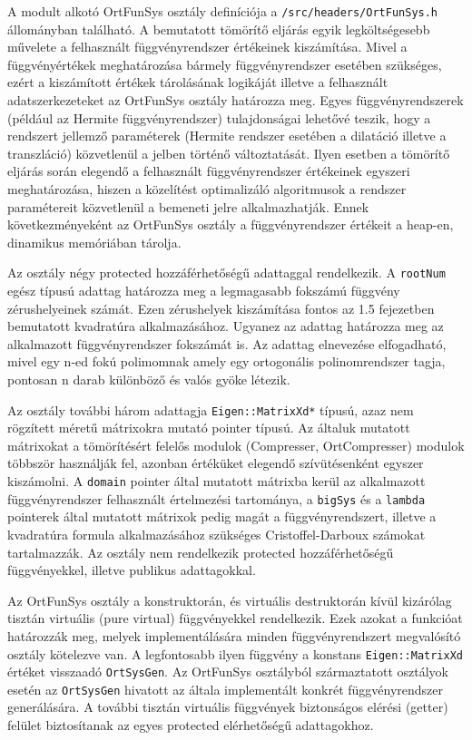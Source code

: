 \documentclass[oneside,titlepage,12pt,a4paper]{report}
\begin{document}
\par  A modult alkotó OrtFunSys osztály definíciója a \texttt{/src/headers/OrtFunSys.h} állományban található. A bemutatott tömörítő eljárás egyik legköltségesebb művelete
a felhasznált függvényrendszer értékeinek kiszámítása. Mivel a függvényértékek meghatározása bármely függvényrendszer esetében szükséges, ezért a kiszámított értékek
tárolásának logikáját illetve a felhasznált adatszerkezeteket az OrtFunSys osztály határozza meg. Egyes függvényrendszerek (például az Hermite függvényrendszer) tulajdonságai
lehetővé teszik, hogy a rendszert jellemző paraméterek (Hermite rendszer esetében a dilatáció illetve a transzláció) közvetlenül a jelben történő változtatását. 
Ilyen esetben a tömörítő eljárás során elegendő a felhasznált függvényrendszer értékeinek egyszeri meghatározása, hiszen a közelítést optimalizáló algoritmusok 
a rendszer paramétereit közvetlenül a bemeneti jelre alkalmazhatják. Ennek következményeként az OrtFunSys osztály a függvényrendszer értékeit a heap-en, dinamikus memóriában tárolja.
\par Az osztály négy protected hozzáférhetőségű adattaggal rendelkezik. A \texttt{rootNum} egész típusú adattag határozza meg a legmagasabb fokszámú függvény zérushelyeinek számát. Ezen zérushelyek kiszámítása fontos az 1.5 fejezetben bemutatott kvadratúra alkalmazásához. Ugyanez az adattag határozza meg az alkalmazott függvényrendszer fokszámát is. Az adattag elnevezése elfogadható, mivel egy n-ed fokú polimomnak amely egy ortogonális polinomrendszer tagja, pontosan n darab különböző és valós gyöke létezik.
\par Az osztály további három adattagja \texttt{Eigen::MatrixXd*} típusú, azaz nem rögzített méretű mátrixokra mutató pointer típusú. Az általuk mutatott mátrixokat a tömörítésért felelős modulok (Compresser, OrtCompresser) modulok többször használják fel, azonban értéküket elegendő szívütésenként egyszer kiszámolni.  A \texttt{domain} pointer által mutatott mátrixba kerül az alkalmazott függvényrendszer felhasznált értelmezési tartománya, a \texttt{bigSys} és a \texttt{lambda} pointerek által mutatott mátrixok pedig magát a függvényrendszert, illetve a kvadratúra formula alkalmazásához szükséges Cristoffel-Darboux számokat tartalmazzák. Az osztály nem rendelkezik protected hozzáférhetőségű függvényekkel, illetve publikus adattagokkal.
\par Az OrtFunSys osztály a konstruktorán, és virtuális destruktorán kívül kizárólag tisztán virtuális (pure virtual) függvényekkel rendelkezik. Ezek azokat a funkcióat határozzák meg, melyek implementálására minden függvényrendszert megvalósító osztály kötelezve van. A legfontosabb ilyen függvény a konstans \texttt{Eigen::MatrixXd} értéket visszaadó \texttt{OrtSysGen}. Az OrtFunSys osztályból származtatott osztályok esetén az \texttt{OrtSysGen} hivatott az általa implementált konkrét függvényrendszer generálására. A további tisztán virtuális függvények biztonságos elérési (getter) felület biztosítanak az egyes protected elérhetőségű adattagokhoz. 
\end{document}
